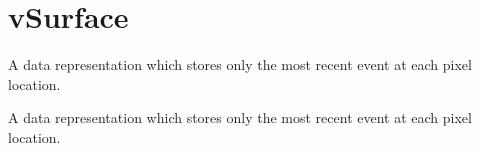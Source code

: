 \hypertarget{group__vSurface}{}\section{v\+Surface}
\label{group__vSurface}


A data representation which stores only the most recent event at each pixel location.  


A data representation which stores only the most recent event at each pixel location. 

